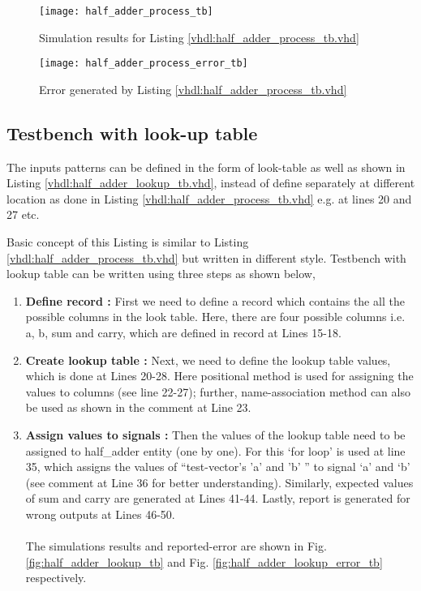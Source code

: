 \begin{figure}[!h]
	\centering
	\texttt{[image: half\_adder\_process\_tb]}
	\caption{Simulation results for Listing \ref{vhdl:half_adder_process_tb.vhd}}
	\label{fig:half_adder_process_tb}
\end{figure}

\begin{figure}[!h]
	\centering
	\texttt{[image: half\_adder\_process\_error\_tb]}
	\caption{Error generated by Listing \ref{vhdl:half_adder_process_tb.vhd}}
	\label{fig:half_adder_process_error_tb}
\end{figure}

\subsection{Testbench with look-up table}

The inputs patterns can be defined in the form of look-table as well as shown in Listing \ref{vhdl:half_adder_lookup_tb.vhd}, instead of define separately at different location as done in Listing \ref {vhdl:half_adder_process_tb.vhd} e.g. at lines 20 and 27 etc. 

\begin{explanation}
	Basic concept of this Listing is similar to Listing \ref {vhdl:half_adder_process_tb.vhd} but written in different style. Testbench with lookup table can be  written using three steps as shown below, 
	
	\begin{enumerate}
		\item \textbf{Define record : } First we need to define a record which contains the all the possible columns in the look table. Here, there are four possible columns i.e. a, b, sum and carry, which are defined in record at Lines 15-18. 
		
		\item \textbf{Create lookup table : }  Next, we need to define the lookup table values, which is done at Lines 20-28. Here positional method is used for assigning the values to columns (see line 22-27); further, name-association method can also be used as shown in the comment at Line 23. 
		
		\item \textbf{Assign values to signals : } Then the values of the lookup table need to be assigned to half\_adder entity (one by one). For this `for loop' is used at line 35, which assigns the values of ``test-vector's 'a' and 'b' '' to signal `a' and `b' (see comment at Line 36 for better understanding). Similarly, expected values of sum and carry are generated at Lines 41-44. Lastly, report is generated for wrong outputs at Lines 46-50. 
		\\
		\\
		The simulations results and reported-error are shown in Fig. \ref{fig:half_adder_lookup_tb} and Fig. \ref{fig:half_adder_lookup_error_tb} respectively. 
	\end{enumerate}
\end{explanation}

